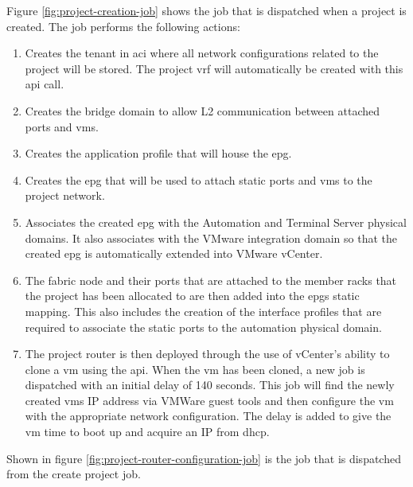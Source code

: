 Figure \ref{fig:project-creation-job} shows the job that is dispatched when a project is created. The job performs the following actions:
\begin{enumerate}
    \item Creates the tenant in \gls{aci} where all network configurations related to the project will be stored. The project \gls{vrf} will automatically be created with this \gls{api} call.
    \item Creates the bridge domain to allow L2 communication between attached ports and \gls{vm}s.
    \item Creates the application profile that will house the \gls{epg}.
    \item Creates the \gls{epg} that will be used to attach static ports and \gls{vm}s to the project network.
    \item Associates the created \gls{epg} with the Automation and Terminal Server physical domains. It also associates with the VMware integration domain so that the created \gls{epg} is automatically extended into VMware vCenter.
    \item The fabric node and their ports that are attached to the member racks that the project has been allocated to are then added into the \gls{epg}s static mapping. This also includes the creation of the interface profiles that are required to associate the static ports to the automation physical domain.
    \item The project router is then deployed through the use of vCenter's ability to clone a \gls{vm} using the \gls{api}. When the \gls{vm} has been cloned, a new job is dispatched with an initial delay of 140 seconds. This job will find the newly created \gls{vm}s IP address via VMWare guest tools and then configure the \gls{vm} with the appropriate network configuration. The delay is added to give the \gls{vm} time to boot up and acquire an IP from \gls{dhcp}. 
\end{enumerate}
Shown in figure \ref{fig:project-router-configuration-job} is the job that is dispatched from the create project job.
